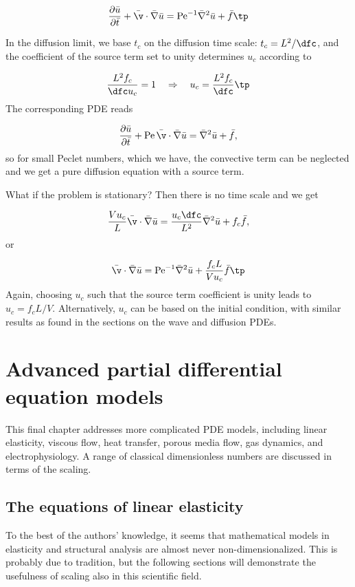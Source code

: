 \documentclass[graybox,envcountchap,sectrefs,final]{svmonodo}
\begin{document}
\[
\frac{\partial\bar u}{\partial\bar t} +
\bar\v\cdot\bar \nabla\bar u =
\hbox{Pe}^{-1}\bar \nabla^2 \bar u + \bar f\tp
\]

In the diffusion limit, we base $t_c$ on the diffusion time scale:
$t_c=L^2/\dfc$, and the coefficient of the source term set to unity
determines $u_c$ according to

\[ \frac{L^2 f_c}{\dfc u_c} = 1\quad\Rightarrow\quad u_c = \frac{L^2 f_c}{\dfc}\tp\]
The corresponding PDE reads

\[
\frac{\partial\bar u}{\partial\bar t} +
\hbox{Pe}\,\bar\v\cdot\bar \nabla\bar u =
\bar\nabla^2 \bar u + \bar f,
\]
so for small Peclet numbers, which we have, the convective term can
be neglected and we get a pure diffusion equation with a source term.

What if the problem is stationary?
Then there is no time scale and we get

\[
\frac{V u_c}{L}\bar\v\cdot\bar \nabla \bar u =
\frac{u_c \dfc}{L^2}\bar\nabla^2 \bar u + f_c\bar f,
\]
or

\[
\bar\v\cdot\bar \nabla \bar u =
\hbox{Pe}^{-1}\bar\nabla^2 \bar u + \frac{f_c L}{V u_c}\bar f\tp
\]
Again, choosing $u_c$ such that the source term coefficient is unity leads
to $u_c= f_c L/V$.
Alternatively, $u_c$ can be based on the initial condition, with similar
results as found in the sections on the wave and diffusion PDEs.


\chapter{Advanced partial differential equation models}

This final chapter addresses more complicated PDE models, including
linear elasticity, viscous flow, heat transfer, porous media flow,
gas dynamics, and electrophysiology. A range of
classical dimensionless numbers are discussed in terms of the scaling.

\section{The equations of linear elasticity}
\label{scale:elasticity}

To the best of the authors' knowledge, it seems that mathematical
models in elasticity and structural analysis are almost never
non-dimensionalized. This is probably due to tradition, but the
following sections will demonstrate the usefulness of scaling also in
this scientific field.
\end{document}
